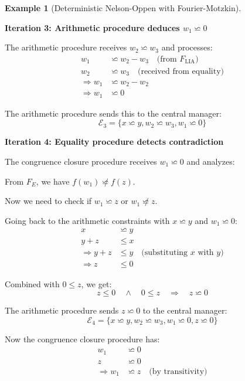 \documentclass[11pt,a4paper]{article}
\theoremstyle{definition}
\newtheorem{example}{Example}[section]
\theoremstyle{plain}
\theoremstyle{remark}
\begin{document}
\begin{example}[Deterministic Nelson-Oppen with Fourier-Motzkin]
\begin{tcolorbox}[colback=blue!5!white,colframe=blue!75!black,title=\textbf{Example 2: UNSAT with Equality Propagation},breakable]
\vspace{0.3em}

\textbf{Iteration 3: Arithmetic procedure deduces $w_1 \backsimeq 0$}

The arithmetic procedure receives $w_2 \backsimeq w_3$ and processes:
\begin{align*}
w_1 &\backsimeq w_2 - w_3 \quad \text{(from $F_{\text{LIA}}$)} \\
w_2 &\backsimeq w_3 \quad \text{(received from equality)} \\
\Rightarrow w_1 &\backsimeq w_2 - w_2 \\
\Rightarrow w_1 &\backsimeq 0
\end{align*}

The arithmetic procedure sends this to the central manager:
\[
\mathcal{E}_3 = \{x \backsimeq y, w_2 \backsimeq w_3, w_1 \backsimeq 0\}
\]

\vspace{0.3em}

\textbf{Iteration 4: Equality procedure detects contradiction}

The congruence closure procedure receives $w_1 \backsimeq 0$ and analyzes:

From $F_E$, we have $f(w_1) \not\backsimeq f(z)$.

Now we need to check if $w_1 \backsimeq z$ or $w_1 \not\backsimeq z$.

Going back to the arithmetic constraints with $x \backsimeq y$ and $w_1 \backsimeq 0$:
\begin{align*}
x &\backsimeq y \\
y + z &\leq x \\
\Rightarrow y + z &\leq y \quad \text{(substituting $x$ with $y$)} \\
\Rightarrow z &\leq 0
\end{align*}

Combined with $0 \leq z$, we get:
\[
z \leq 0 \quad \wedge \quad 0 \leq z \quad \Rightarrow \quad z \backsimeq 0
\]

The arithmetic procedure sends $z \backsimeq 0$ to the central manager:
\[
\mathcal{E}_4 = \{x \backsimeq y, w_2 \backsimeq w_3, w_1 \backsimeq 0, z \backsimeq 0\}
\]

Now the congruence closure procedure has:
\begin{align*}
w_1 &\backsimeq 0 \\
z &\backsimeq 0 \\
\Rightarrow w_1 &\backsimeq z \quad \text{(by transitivity)}
\end{align*}


\end{tcolorbox}
\end{example}
\end{document}
